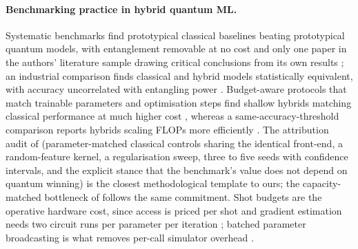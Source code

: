 \paragraph{Benchmarking practice in hybrid quantum ML.}
Systematic benchmarks find prototypical classical baselines beating
prototypical quantum models, with entanglement removable at no cost and only
one paper in the authors' literature sample drawing critical conclusions from
its own results \citep{bowles2024better}; an industrial comparison finds
classical and hybrid models statistically equivalent, with accuracy
uncorrelated with entangling power \citep{basilewitsch2024quantum}. Budget-aware
protocols that match trainable parameters and optimisation steps find shallow
hybrids matching classical performance at much higher cost
\citep{bendouma2026fair}, whereas a same-accuracy-threshold comparison reports
hybrids scaling FLOPs more efficiently \citep{kashif2024computational}. The
attribution audit of \citet{gillani2026quantum} (parameter-matched classical
controls sharing the identical front-end, a random-feature kernel, a
regularisation sweep, three to five seeds with confidence intervals, and the
explicit stance that the benchmark's value does not depend on quantum winning) is the closest methodological template to ours; the capacity-matched
bottleneck of \citet{chen2025quantumd} follows the same commitment. Shot
budgets are the operative hardware cost, since access is priced per shot
\citep{liu2025you} and gradient estimation needs two circuit runs per parameter
per iteration \citep{scriva2023challenges,miroszewski2024search}; batched
parameter broadcasting is what removes per-call simulator overhead
\citep{chen2025batched}.

